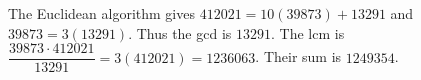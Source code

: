 The Euclidean algorithm gives $412021=10(39873)+13291$ and $39873=3(13291)$. Thus the gcd is $13291$. The lcm is $\dfrac{39873\cdot412021}{13291}=3(412021)=1236063$. Their sum is $\boxed{1249354}$.
